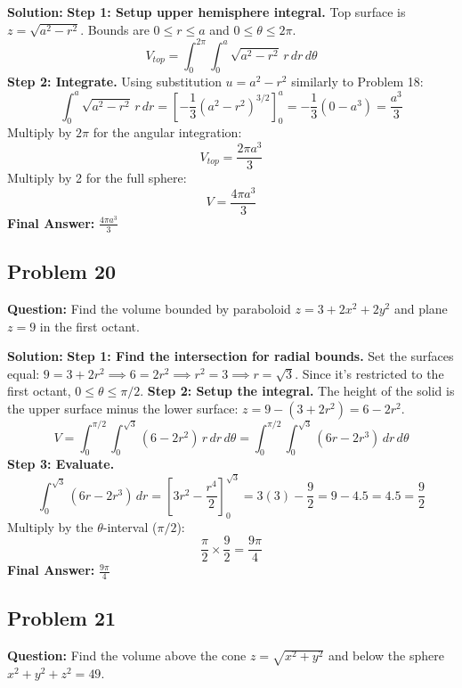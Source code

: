 \documentclass[12pt]{article}
\begin{document}
\textbf{Solution:}
\textbf{Step 1: Setup upper hemisphere integral.}
Top surface is $z = \sqrt{a^2 - r^2}$. Bounds are $0 \le r \le a$ and $0 \le \theta \le 2\pi$.
\[ V_{top} = \int_0^{2\pi} \int_0^a \sqrt{a^2-r^2} \, r \, dr \, d\theta \]
\textbf{Step 2: Integrate.}
Using substitution $u = a^2-r^2$ similarly to Problem 18:
\[ \int_0^a \sqrt{a^2-r^2} \, r \, dr = \left[ -\frac{1}{3}(a^2-r^2)^{3/2} \right]_0^a = -\frac{1}{3}(0 - a^3) = \frac{a^3}{3} \]
Multiply by $2\pi$ for the angular integration:
\[ V_{top} = \frac{2\pi a^3}{3} \]
Multiply by 2 for the full sphere:
\[ V = \frac{4\pi a^3}{3} \]
\textbf{Final Answer:} $\frac{4\pi a^3}{3}$

\subsection*{Problem 20}
\textbf{Question:} Find the volume bounded by paraboloid $z=3+2x^2+2y^2$ and plane $z=9$ in the first octant.

\textbf{Solution:}
\textbf{Step 1: Find the intersection for radial bounds.}
Set the surfaces equal: $9 = 3 + 2r^2 \implies 6 = 2r^2 \implies r^2 = 3 \implies r = \sqrt{3}$.
Since it's restricted to the first octant, $0 \le \theta \le \pi/2$.
\textbf{Step 2: Setup the integral.}
The height of the solid is the upper surface minus the lower surface: $z = 9 - (3 + 2r^2) = 6 - 2r^2$.
\[ V = \int_0^{\pi/2} \int_0^{\sqrt{3}} (6 - 2r^2) \, r \, dr \, d\theta = \int_0^{\pi/2} \int_0^{\sqrt{3}} (6r - 2r^3) \, dr \, d\theta \]
\textbf{Step 3: Evaluate.}
\[ \int_0^{\sqrt{3}} (6r - 2r^3) \, dr = \left[ 3r^2 - \frac{r^4}{2} \right]_0^{\sqrt{3}} = 3(3) - \frac{9}{2} = 9 - 4.5 = 4.5 = \frac{9}{2} \]
Multiply by the $\theta$-interval ($\pi/2$):
\[ \frac{\pi}{2} \times \frac{9}{2} = \frac{9\pi}{4} \]
\textbf{Final Answer:} $\frac{9\pi}{4}$

\subsection*{Problem 21}
\textbf{Question:} Find the volume above the cone $z = \sqrt{x^2+y^2}$ and below the sphere $x^2+y^2+z^2=49$.
\end{document}
